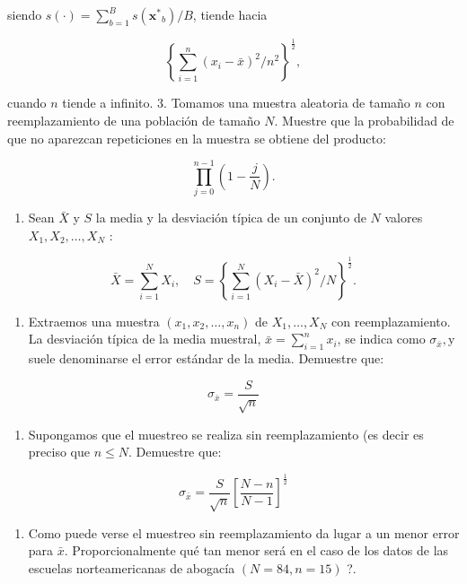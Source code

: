 \documentclass[
]{article}
\providecommand{\tightlist}{%
  \setlength{\itemsep}{0pt}\setlength{\parskip}{0pt}}
\begin{document}
siendo \(s(\cdot)=\sum_{b=1}^{B} s\left(\mathbf{x}^{*}{ }_{b}\right) / B\), tiende hacia

\[
\left\{\sum_{i=1}^{n}\left(x_{i}-\bar{x}\right)^{2} / n^{2}\right\}^{\frac{1}{2}},
\]

cuando \(n\) tiende a infinito.
3. Tomamos una muestra aleatoria de tamaño \(n\) con reemplazamiento de una población de tamaño \(N\). Muestre que la probabilidad de que no aparezcan repeticiones en la muestra se obtiene del producto:

\[
\prod_{j=0}^{n-1}\left(1-\frac{j}{N}\right) .
\]

\begin{enumerate}
\def\labelenumi{\arabic{enumi}.}
\setcounter{enumi}{3}
\tightlist
\item
  Sean \(\bar{X}\) y \(S\) la media y la desviación típica de un conjunto de \(N\) valores \(X_{1}, X_{2}, \ldots, X_{N}\) :
\end{enumerate}

\[
\bar{X}=\sum_{i=1}^{N} X_{i}, \quad S=\left\{\sum_{i=1}^{N}\left(X_{i}-\bar{X}\right)^{2} / N\right\}^{\frac{1}{2}} .
\]

\begin{enumerate}
\def\labelenumi{\alph{enumi})}
\tightlist
\item
  Extraemos una muestra \(\left(x_{1}, x_{2}, \ldots, x_{n}\right)\) de \(X_{1}, \ldots, X_{N}\) con reemplazamiento. La desviación típica de la media muestral, \(\bar{x}=\sum_{i=1}^{n} x_{i}\), se indica como \(\sigma_{\bar{x}}, \mathrm{y}\) suele denominarse el error estándar de la media. Demuestre que:
\end{enumerate}

\[
\sigma_{\bar{x}}=\frac{S}{\sqrt{n}}
\]

\begin{enumerate}
\def\labelenumi{\alph{enumi})}
\setcounter{enumi}{1}
\tightlist
\item
  Supongamos que el muestreo se realiza sin reemplazamiento (es decir es preciso que \(n \leq N\). Demuestre que:
\end{enumerate}

\[
\sigma_{\bar{x}}=\frac{S}{\sqrt{n}}\left[\frac{N-n}{N-1}\right]^{\frac{1}{2}}
\]

\begin{enumerate}
\def\labelenumi{\alph{enumi})}
\setcounter{enumi}{2}
\tightlist
\item
  Como puede verse el muestreo sin reemplazamiento da lugar a un menor error para \(\bar{x}\). Proporcionalmente qué tan menor será en el caso de los datos de las escuelas norteamericanas de abogacía \((N=84, n=15)\) ?.
\end{enumerate}
\end{document}
